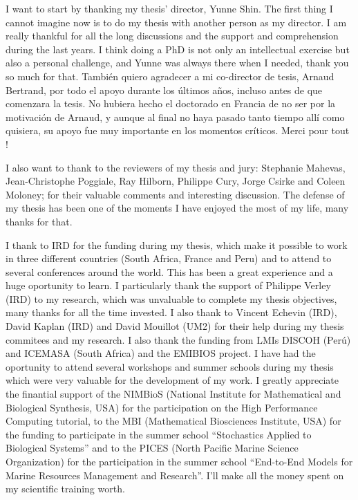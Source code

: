 I want to start by thanking my thesis' director, Yunne Shin. The first thing I cannot imagine now is to do my thesis with another person as my director. I am really thankful for all the long discussions and the support and comprehension during the last years. I think doing a PhD is not only an intellectual exercise but also a personal challenge, and Yunne was always there when I needed, thank you so much for that. También quiero agradecer a mi co-director de tesis, Arnaud Bertrand, por todo el apoyo durante los últimos años, incluso antes de que comenzara la tesis. No hubiera hecho el doctorado en Francia de no ser por la motivación de Arnaud, y aunque al final no haya pasado tanto tiempo allí como quisiera, su apoyo fue muy importante en los momentos críticos. Merci pour tout !

I also want to thank to the reviewers of my thesis and jury: Stephanie Mahevas, Jean-Christophe Poggiale, Ray Hilborn, Philippe Cury, Jorge Csirke and Coleen Moloney; for their valuable comments and interesting discussion. The defense of my thesis has been one of the moments I have enjoyed the most of my life, many thanks for that.

I thank to IRD for the funding during my thesis, which make it possible to work in three different countries (South Africa, France and Peru) and to attend to several conferences around the world. This has been a great experience and a huge oportunity to learn. I particularly thank the support of Philippe \mbox{Verley} (IRD) to my research, which was unvaluable to complete my thesis objectives, many thanks for all the time invested. I also thank to Vincent Echevin (IRD), David Kaplan (IRD) and David Mouillot (UM2) for their help during my thesis commitees and my research. I also thank the funding from LMIs \mbox{DISCOH} (Perú) and \mbox{ICEMASA} (South Africa) and the EMIBIOS project. I have had the oportunity to attend several workshops and summer schools during my thesis which were very valuable for the development of my work. I greatly appreciate the finantial support of the NIMBioS (National Institute for Mathematical and Biological Synthesis, USA) for the participation on the High Performance Computing tutorial, to the MBI (Mathematical Biosciences Institute, USA) for the funding to participate in the summer school ``Stochastics Applied to Biological Systems'' and to the PICES (North Pacific Marine Science Organization) for the participation in the summer school ``End-to-End Models for Marine Resources Management and Research''. I'll make all the money spent on my scientific training worth.

